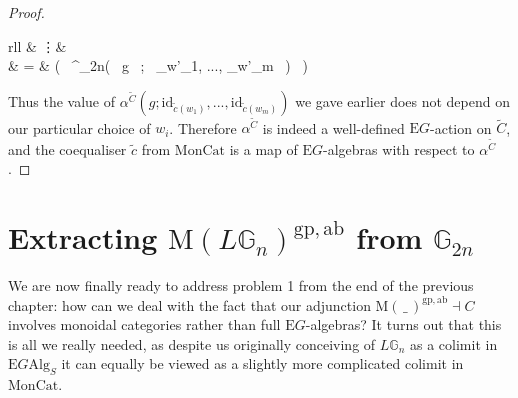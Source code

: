 \begin{proof}
\begin{eq*}
\begin{array}{rll}
			& \vdots & \\
			& = & \big( \, \alpha^{_{2n}}( \, g \, ; \, _{w'_1}, ..., _{w'_m} \, ) \, \big)
		\end{array} 
\end{eq*}
Thus the value of $\alpha^{\tilde{C}}(g; \mathrm{id}_{\tilde{c}(w_1)}, ..., \mathrm{id}_{\tilde{c}(w_m)})$ we gave earlier does not depend on our particular choice of $w_i$. Therefore $\alpha^{\tilde{C}}$ is indeed a well-defined $\mathrm{E}G$-action on $\tilde{C}$, and the coequaliser $\tilde{c}$ from $\mathrm{MonCat}$ is a map of $\mathrm{E}G$-algebras with respect to $\alpha^{\tilde{C}}$.
\end{proof}

\section{Extracting $\mathrm{M}(L\mathbb{G}_n)^{\mathrm{gp},\mathrm{ab}}$ from $\mathbb{G}_{2n}$}

We are now finally ready to address problem 1 from the end of the previous chapter: how can we deal with the fact that our adjunction $\mathrm{M}(\, \_ \,)^{\mathrm{gp},\mathrm{ab}} \dashv C$ involves monoidal categories rather than full $\mathrm{E}G$-algebras? It turns out that this is all we really needed, as despite us originally conceiving of $L\mathbb{G}_n$ as a colimit in $\mathrm{E}G\mathrm{Alg}_S$ it can equally be viewed as a slightly more complicated colimit in $\mathrm{MonCat}$.

